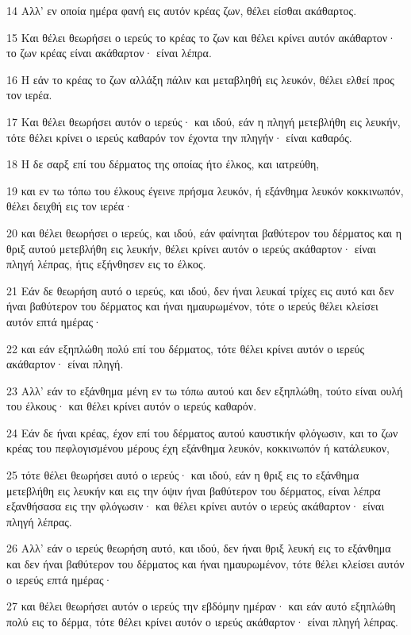 \par 14 Αλλ' εν οποία ημέρα φανή εις αυτόν κρέας ζων, θέλει είσθαι ακάθαρτος.
\par 15 Και θέλει θεωρήσει ο ιερεύς το κρέας το ζων και θέλει κρίνει αυτόν ακάθαρτον· το ζων κρέας είναι ακάθαρτον· είναι λέπρα.
\par 16 Η εάν το κρέας το ζων αλλάξη πάλιν και μεταβληθή εις λευκόν, θέλει ελθεί προς τον ιερέα.
\par 17 Και θέλει θεωρήσει αυτόν ο ιερεύς· και ιδού, εάν η πληγή μετεβλήθη εις λευκήν, τότε θέλει κρίνει ο ιερεύς καθαρόν τον έχοντα την πληγήν· είναι καθαρός.
\par 18 Η δε σαρξ επί του δέρματος της οποίας ήτο έλκος, και ιατρεύθη,
\par 19 και εν τω τόπω του έλκους έγεινε πρήσμα λευκόν, ή εξάνθημα λευκόν κοκκινωπόν, θέλει δειχθή εις τον ιερέα·
\par 20 και θέλει θεωρήσει ο ιερεύς, και ιδού, εάν φαίνηται βαθύτερον του δέρματος και η θριξ αυτού μετεβλήθη εις λευκήν, θέλει κρίνει αυτόν ο ιερεύς ακάθαρτον· είναι πληγή λέπρας, ήτις εξήνθησεν εις το έλκος.
\par 21 Εάν δε θεωρήση αυτό ο ιερεύς, και ιδού, δεν ήναι λευκαί τρίχες εις αυτό και δεν ήναι βαθύτερον του δέρματος και ήναι ημαυρωμένον, τότε ο ιερεύς θέλει κλείσει αυτόν επτά ημέρας·
\par 22 και εάν εξηπλώθη πολύ επί του δέρματος, τότε θέλει κρίνει αυτόν ο ιερεύς ακάθαρτον· είναι πληγή.
\par 23 Αλλ' εάν το εξάνθημα μένη εν τω τόπω αυτού και δεν εξηπλώθη, τούτο είναι ουλή του έλκους· και θέλει κρίνει αυτόν ο ιερεύς καθαρόν.
\par 24 Εάν δε ήναι κρέας, έχον επί του δέρματος αυτού καυστικήν φλόγωσιν, και το ζων κρέας του πεφλογισμένου μέρους έχη εξάνθημα λευκόν, κοκκινωπόν ή κατάλευκον,
\par 25 τότε θέλει θεωρήσει αυτό ο ιερεύς· και ιδού, εάν η θριξ εις το εξάνθημα μετεβλήθη εις λευκήν και εις την όψιν ήναι βαθύτερον του δέρματος, είναι λέπρα εξανθήσασα εις την φλόγωσιν· και θέλει κρίνει αυτόν ο ιερεύς ακάθαρτον· είναι πληγή λέπρας.
\par 26 Αλλ' εάν ο ιερεύς θεωρήση αυτό, και ιδού, δεν ήναι θριξ λευκή εις το εξάνθημα και δεν ήναι βαθύτερον του δέρματος και ήναι ημαυρωμένον, τότε θέλει κλείσει αυτόν ο ιερεύς επτά ημέρας·
\par 27 και θέλει θεωρήσει αυτόν ο ιερεύς την εβδόμην ημέραν· και εάν αυτό εξηπλώθη πολύ εις το δέρμα, τότε θέλει κρίνει αυτόν ο ιερεύς ακάθαρτον· είναι πληγή λέπρας.
